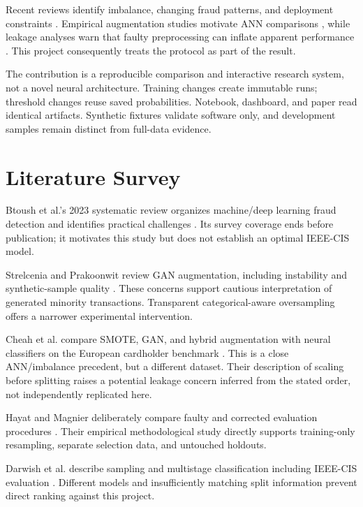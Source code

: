 \documentclass[11pt,a4paper]{article}
\begin{document}
Recent reviews identify imbalance, changing fraud patterns, and deployment constraints \cite{btoush2023review,strelcenia2023survey}. Empirical augmentation studies motivate ANN comparisons \cite{cheah2023smotegan}, while leakage analyses warn that faulty preprocessing can inflate apparent performance \cite{hayat2025leakage}. This project consequently treats the protocol as part of the result.

The contribution is a reproducible comparison and interactive research system, not a novel neural architecture. Training changes create immutable runs; threshold changes reuse saved probabilities. Notebook, dashboard, and paper read identical artifacts. Synthetic fixtures validate software only, and development samples remain distinct from full-data evidence.

\section{Literature Survey}
Btoush et al.'s 2023 systematic review organizes machine/deep learning fraud detection and identifies practical challenges \cite{btoush2023review}. Its survey coverage ends before publication; it motivates this study but does not establish an optimal IEEE-CIS model.

Strelcenia and Prakoonwit review GAN augmentation, including instability and synthetic-sample quality \cite{strelcenia2023survey}. These concerns support cautious interpretation of generated minority transactions. Transparent categorical-aware oversampling offers a narrower experimental intervention.

Cheah et al. compare SMOTE, GAN, and hybrid augmentation with neural classifiers on the European cardholder benchmark \cite{cheah2023smotegan}. This is a close ANN/imbalance precedent, but a different dataset. Their description of scaling before splitting raises a potential leakage concern inferred from the stated order, not independently replicated here.

Hayat and Magnier deliberately compare faulty and corrected evaluation procedures \cite{hayat2025leakage}. Their empirical methodological study directly supports training-only resampling, separate selection data, and untouched holdouts.

Darwish et al. describe sampling and multistage classification including IEEE-CIS evaluation \cite{darwish2025abc}. Different models and insufficiently matching split information prevent direct ranking against this project.
\end{document}
